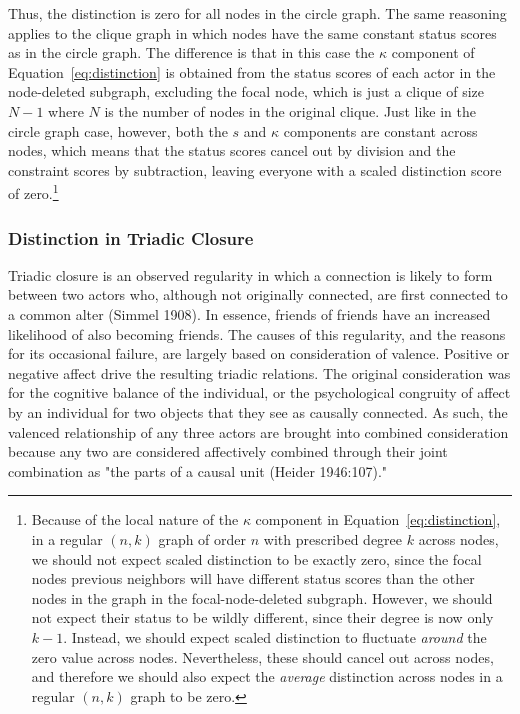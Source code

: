 \documentclass[12pt]{article}
\begin{document}
Thus, the distinction is zero for all nodes in the circle graph. The same reasoning applies to the clique graph in which nodes have the same constant status scores as in the circle graph. The difference is that in this case the $\kappa$ component of Equation~\ref{eq:distinction} is obtained from the status scores of each actor in the node-deleted subgraph, excluding the focal node, which is just a clique of size $N-1$ where $N$ is the number of nodes in the original clique. Just like in the circle graph case, however, both the $s$ and $\kappa$ components are constant across nodes, which means that the status scores cancel out by division and the constraint scores by subtraction, leaving everyone with a scaled distinction score of zero.\footnote{Because of the local nature of the $\kappa$ component in Equation~\ref{eq:distinction}, in a regular $(n, k)$ graph of order $n$ with prescribed degree $k$ across nodes, we should not expect scaled distinction to be exactly zero, since the focal nodes previous neighbors will have different status scores than the other nodes in the graph in the focal-node-deleted subgraph. However, we should not expect their status to be wildly different, since their degree is now only $k-1$. Instead, we should expect scaled distinction to fluctuate \textit{around} the zero value across nodes. Nevertheless, these should cancel out across nodes, and therefore we should also expect the \textit{average} distinction across nodes in a regular $(n, k)$ graph to be zero.} 



\subsubsection{Distinction in Triadic Closure}

Triadic closure is an observed regularity in which a connection is likely to form between two actors who, although not originally connected, are first connected to a common alter (Simmel 1908). In essence, friends of friends have an increased likelihood of also becoming friends. The causes of this regularity, and the reasons for its occasional failure, are largely based on consideration of valence. Positive or negative affect drive the resulting triadic relations. The original consideration was for the cognitive balance of the individual, or the psychological congruity of affect by an individual for two objects that they see as causally connected. As such, the valenced relationship of any three actors are brought into combined consideration because any two are considered affectively combined through their joint combination as "the parts of a causal unit (Heider 1946:107)."
\end{document}
